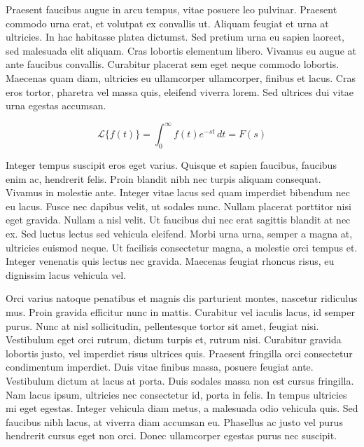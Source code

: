 Praesent faucibus augue in arcu tempus, vitae posuere leo pulvinar. Praesent commodo urna erat, et volutpat ex convallis ut. Aliquam feugiat et urna at ultricies. In hac habitasse platea dictumst. Sed pretium urna eu sapien laoreet, sed malesuada elit aliquam. Cras lobortis elementum libero. Vivamus eu augue at ante faucibus convallis. Curabitur placerat sem eget neque commodo lobortis. Maecenas quam diam, ultricies eu ullamcorper ullamcorper, finibus et lacus. Cras eros tortor, pharetra vel massa quis, eleifend viverra lorem. Sed ultrices dui vitae urna egestas accumsan.

\begin{equation}
  \mathcal{L}\{f(t)\} = \int_0^{\infty} f(t) e^{-st} \, dt = F(s)
\end{equation}

Integer tempus suscipit eros eget varius. Quisque et sapien faucibus, faucibus enim ac, hendrerit felis. Proin blandit nibh nec turpis aliquam consequat. Vivamus in molestie ante. Integer vitae lacus sed quam imperdiet bibendum nec eu lacus. Fusce nec dapibus velit, ut sodales nunc. Nullam placerat porttitor nisi eget gravida. Nullam a nisl velit. Ut faucibus dui nec erat sagittis blandit at nec ex. Sed luctus lectus sed vehicula eleifend. Morbi urna urna, semper a magna at, ultricies euismod neque. Ut facilisis consectetur magna, a molestie orci tempus et. Integer venenatis quis lectus nec gravida. Maecenas feugiat rhoncus risus, eu dignissim lacus vehicula vel.

Orci varius natoque penatibus et magnis dis parturient montes, nascetur ridiculus mus. Proin gravida efficitur nunc in mattis. Curabitur vel iaculis lacus, id semper purus. Nunc at nisl sollicitudin, pellentesque tortor sit amet, feugiat nisi. Vestibulum eget orci rutrum, dictum turpis et, rutrum nisi. Curabitur gravida lobortis justo, vel imperdiet risus ultrices quis. Praesent fringilla orci consectetur condimentum imperdiet. Duis vitae finibus massa, posuere feugiat ante. Vestibulum dictum at lacus at porta. Duis sodales massa non est cursus fringilla. Nam lacus ipsum, ultricies nec consectetur id, porta in felis. In tempus ultricies mi eget egestas. Integer vehicula diam metus, a malesuada odio vehicula quis. Sed faucibus nibh lacus, at viverra diam accumsan eu. Phasellus ac justo vel purus hendrerit cursus eget non orci. Donec ullamcorper egestas purus nec suscipit.


